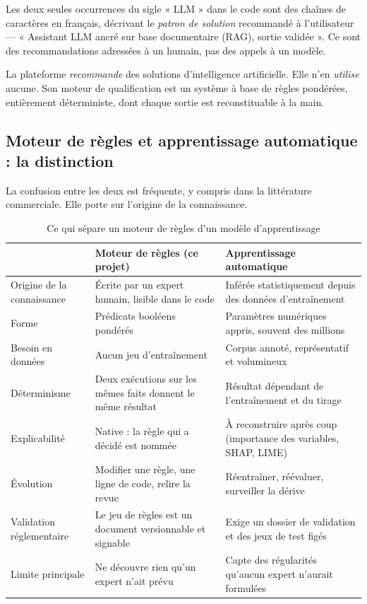 Les deux seules occurrences du sigle « LLM » dans le code sont des chaînes de caractères
en français, décrivant le \emph{patron de solution} recommandé à l'utilisateur —
« Assistant LLM ancré sur base documentaire (RAG), sortie validée ». Ce sont des
recommandations adressées à un humain, pas des appels à un modèle.

\begin{remarque}
La plateforme \emph{recommande} des solutions d'intelligence artificielle. Elle n'en
\emph{utilise} aucune. Son moteur de qualification est un système à base de règles
pondérées, entièrement déterministe, dont chaque sortie est reconstituable à la main.
\end{remarque}

\subsection{Moteur de règles et apprentissage automatique : la distinction}

La confusion entre les deux est fréquente, y compris dans la littérature commerciale.
Elle porte sur l'origine de la connaissance.

\begin{table}[H]
\centering
\caption{Ce qui sépare un moteur de règles d'un modèle d'apprentissage}
\label{tab:regles-vs-ml}
\small
\begin{tabular}{@{}L{3.3cm} L{5.3cm} L{5.3cm}@{}}
\toprule
& \textbf{Moteur de règles (ce projet)} & \textbf{Apprentissage automatique} \\
\midrule
Origine de la connaissance
& Écrite par un expert humain, lisible dans le code
& Inférée statistiquement depuis des données d'entraînement \\
Forme
& Prédicats booléens pondérés
& Paramètres numériques appris, souvent des millions \\
Besoin en données
& Aucun jeu d'entraînement
& Corpus annoté, représentatif et volumineux \\
Déterminisme
& Deux exécutions sur les mêmes faits donnent le même résultat
& Résultat dépendant de l'entraînement et du tirage \\
Explicabilité
& Native : la règle qui a décidé est nommée
& À reconstruire après coup (importance des variables, SHAP, LIME) \\
Évolution
& Modifier une règle, une ligne de code, relire la revue
& Réentraîner, réévaluer, surveiller la dérive \\
Validation réglementaire
& Le jeu de règles est un document versionnable et signable
& Exige un dossier de validation et des jeux de test figés \\
Limite principale
& Ne découvre rien qu'un expert n'ait prévu
& Capte des régularités qu'aucun expert n'aurait formulées \\
\bottomrule
\end{tabular}
\end{table}

